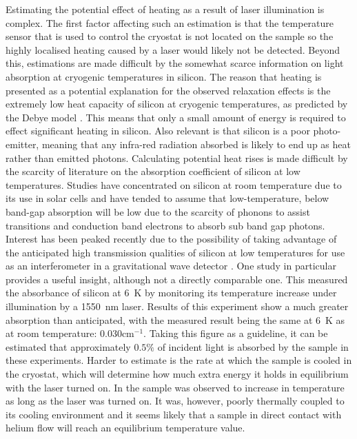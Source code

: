 Estimating the potential effect of heating as a result of laser illumination is complex.
The first factor affecting such an estimation is that the temperature sensor that is used to control the cryostat is not located on the sample so the highly localised heating caused by a laser would likely not be detected.
Beyond this, estimations are made difficult by the somewhat scarce information on light absorption at cryogenic temperatures in silicon.
The reason that heating is presented as a potential explanation for the observed relaxation effects is the extremely low heat capacity of silicon at cryogenic temperatures, as predicted by the Debye model \cite{ANDP:ANDP19123441404}.
This means that only a small amount of energy is required to effect significant heating in silicon.
Also relevant is that silicon is a poor photo-emitter, meaning that any infra-red radiation absorbed is likely to end up as heat rather than emitted photons. 
Calculating potential heat rises is made difficult by the scarcity of literature on the absorption coefficient of silicon at low temperatures.
Studies have concentrated on silicon at room temperature due to its use in solar cells and have tended to assume that low-temperature, below band-gap absorption will be low due to the scarcity of phonons to assist transitions and conduction band electrons to absorb sub band gap photons.
Interest has been peaked recently due to the possibility of taking advantage of the anticipated high transmission qualities of silicon at low temperatures for use as an interferometer in a gravitational wave detector \cite{Degallaix2014}.
One study in particular provides a useful insight, although not a directly comparable one.
This measured the absorbance of silicon at 6~K by monitoring its temperature increase under illumination by a 1550~nm laser.
Results of this experiment show a much greater absorption than anticipated, with the measured result being the same at 6~K as at room temperature: 0.030cm$^{-1}$.
Taking this figure as a guideline, it can be estimated that approximately $0.5\%$ of incident light is absorbed by the sample in these experiments.
Harder to estimate is the rate at which the sample is cooled in the cryostat, which will determine how much extra energy it holds in equilibrium with the laser turned on.
In \cite{Degallaix2014} the sample was observed to increase in temperature as long as the laser was turned on.
It was, however, poorly thermally coupled to its cooling environment and it seems likely that a sample in direct contact with helium flow will reach an equilibrium temperature value.
